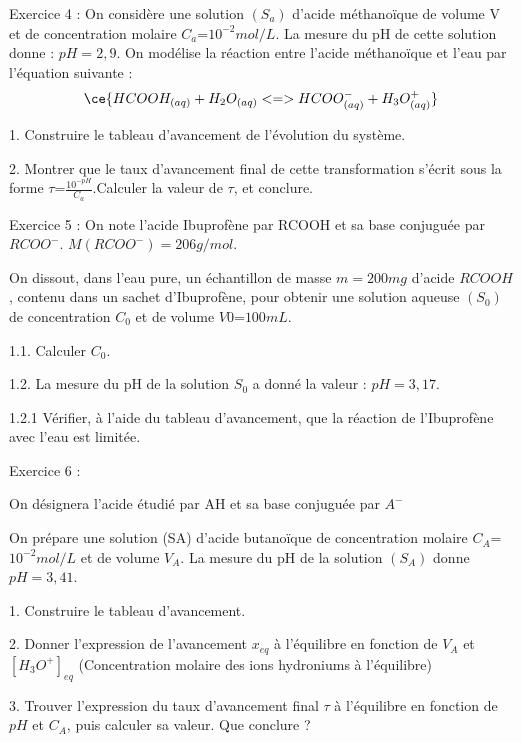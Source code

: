\documentclass[12pt, french]{article}
\begin{document}
\vspace{-0.6cm}
\begin{Box2}{Exercice 4 : }
	On considère une solution $(S_a)$ d’acide méthanoïque de volume V et de concentration molaire $C_a$=$ 10^{-2} mol/L$.
La mesure du pH de cette solution donne : $pH = 2,9$.
On modélise la réaction entre l’acide méthanoïque et l’eau par l’équation suivante :
\vspace{-0.4cm}
$$\ce{HCOOH_{(aq)} + H_2O_{(aq)} <=> HCOO^-_{(aq)} + H_3O^+_{(aq)} }$$

1. Construire le tableau d’avancement de l’évolution du système.

2. Montrer que le taux d’avancement final de cette transformation s’écrit sous la forme $\tau $=$ \frac{10^{-pH}}{C_a}$.Calculer la valeur de $\tau$, et conclure.

\end{Box2}

\begin{Box2}{Exercice 5 : }
On note l’acide Ibuprofène par RCOOH et sa base conjuguée par $RCOO^-$. $M(RCOO^-) = 206g/mol$.

On dissout, dans l'eau pure, un échantillon de masse $m = 200 mg$ d'acide $RCOOH$, contenu dans un sachet
d'Ibuprofène, pour obtenir une solution aqueuse $(S_0)$ de concentration $C_0$ et de volume $V0 $=$ 100 mL$.

1.1. Calculer $C_0$.

1.2. La mesure du pH de la solution $S_0$ a donné la valeur : $pH = 3,17$.

1.2.1 Vérifier, à l'aide du tableau d'avancement, que la réaction de l’Ibuprofène avec l'eau est limitée.

\end{Box2}


\begin{Box2}{Exercice 6 : }

On désignera l’acide étudié par AH et sa base conjuguée par $A^-$ 

On prépare une solution (SA) d’acide butanoïque de concentration molaire $C_A$=$ 10^{-2} mol/L$ et de volume $V_A$.
La mesure du pH de la solution $(S_A)$ donne $pH = 3,41$.

1. Construire le tableau d’avancement.

2. Donner l’expression de l’avancement $x_{eq}$ à l’équilibre en fonction de $V_A$ et $[H_3O^+]_{eq}$ (Concentration molaire
des ions hydroniums à l’équilibre)

3. Trouver l’expression du taux d’avancement final $\tau$ à l’équilibre en fonction de $pH$ et $C_A$, puis calculer sa
valeur. Que conclure ?


\end{Box2}
\end{document}
